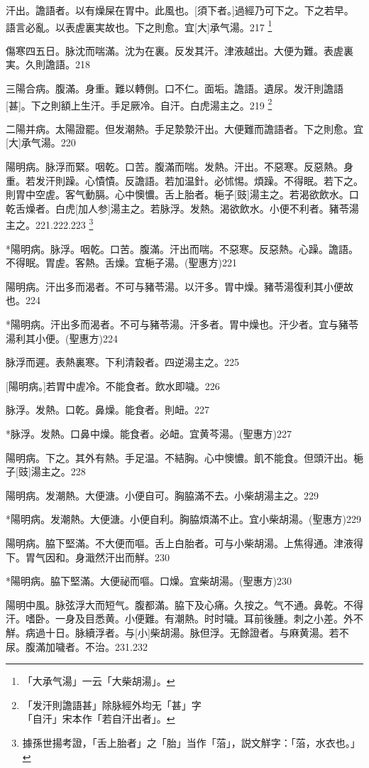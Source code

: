 \documentclass[12pt,twoside,UTF8,b5paper]{ctexbook}
\begin{document}
汗出。譫語者。以有燥屎在胃中。此風也。[須下者。]過經乃可下之。下之若早。語言必亂。以表虗裏実故也。下之則愈。宜[大]承气湯。217
	\footnote{「大承气湯」一云「大柴胡湯」。}

傷寒四五日。脉沈而喘滿。沈为在裏。反发其汗。津液越出。大便为難。表虗裏実。久則譫語。218

三陽合病。腹滿。身重。難以轉側。口不仁。面垢。譫語。遺尿。发汗則譫語[甚]。下之則額上生汗。手足厥冷。自汗。白虎湯主之。219
	\footnote{「发汗則譫語甚」除脉經外均无「甚」字\\「自汗」宋本作「若自汗出者」。}

二陽并病。太陽證罷。但发潮熱。手足漐漐汗出。大便難而譫語者。下之則愈。宜[大]承气湯。220

陽明病。脉浮而緊。咽乾。口苦。腹滿而喘。发熱。汗出。不惡寒。反惡熱。身重。若发汗則躁。心憒憒。反譫語。若加温針。必怵惕。煩躁。不得眠。若下之。則胃中空虗。客气動膈。心中懊憹。舌上胎者。梔子[豉]湯主之。若渴欲飲水。口乾舌燥者。白虎[加人参]湯主之。若脉浮。发熱。渴欲飲水。小便不利者。豬苓湯主之。221.222.223
	\footnote{據孫世揚考證，「舌上胎者」之「胎」当作「菭」，説文觧字：「菭，水衣也。」}

*陽明病。脉浮。咽乾。口苦。腹滿。汗出而喘。不惡寒。反惡熱。心躁。譫語。不得眠。胃虗。客熱。舌燥。宜梔子湯。(聖惠方)221

陽明病。汗出多而渴者。不可与豬苓湯。以汗多。胃中燥。豬苓湯復利其小便故也。224

*陽明病。汗出多而渴者。不可与豬苓湯。汗多者。胃中燥也。汗少者。宜与豬苓湯利其小便。(聖惠方)224

脉浮而遲。表熱裏寒。下利清穀者。四逆湯主之。225

[陽明病。]若胃中虗冷。不能食者。飲水即噦。226

脉浮。发熱。口乾。鼻燥。能食者。則衄。227

*脉浮。发熱。口鼻中燥。能食者。必衄。宜黄芩湯。(聖惠方)227

陽明病。下之。其外有熱。手足温。不結胸。心中懊憹。飢不能食。但頭汗出。梔子[豉]湯主之。228

陽明病。发潮熱。大便溏。小便自可。胸脇滿不去。小柴胡湯主之。229

*陽明病。发潮熱。大便溏。小便自利。胸脇煩滿不止。宜小柴胡湯。(聖惠方)229

陽明病。脇下堅滿。不大便而嘔。舌上白胎者。可与小柴胡湯。上焦得通。津液得下。胃气因和。身濈然汗出而觧。230

*陽明病。脇下堅滿。大便祕而嘔。口燥。宜柴胡湯。(聖惠方)230

陽明中風。脉弦浮大而短气。腹都滿。脇下及心痛。久按之。气不通。鼻乾。不得汗。嗜卧。一身及目悉黄。小便難。有潮熱。时时噦。耳前後腫。刺之小差。外不觧。病過十日。脉續浮者。与[小]柴胡湯。脉但浮。无餘證者。与麻黄湯。若不尿。腹滿加噦者。不治。231.232
\end{document}
